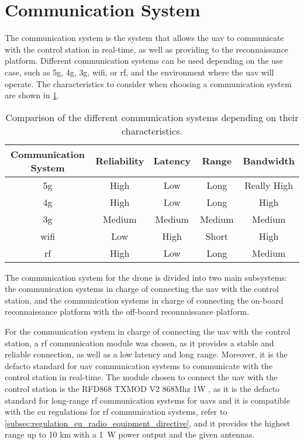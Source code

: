 \section{Communication System}\label{sec:design_communication_system}

The communication system is the system that allows the \gls{uav} to communicate with the control station in real-time, as well as providing to the reconnaissance platform. Different communication systems can be used depending on the use case, such as \gls{5g}, \gls{4g}, \gls{3g}, \gls{wifi}, or \gls{rf}, and the environment where the \gls{uav} will operate. The characteristics to consider when choosing a communication system are shown in \cref{tab:communication_system_characteristics}.

\begin{table}
  \begin{tabular}{ c c c c c }
    \toprule
    \textbf{Communication System} & \textbf{Reliability} & \textbf{Latency} & \textbf{Range} & \textbf{Bandwidth} \\
    \midrule
    \gls{5g} & High & Low & Long & Really High \\
    \gls{4g} & High & Low & Long & High \\
    \gls{3g} & Medium & Medium & Medium & Medium \\
    \gls{wifi} & Low & High & Short & High \\
    \gls{rf} & High & Low & Long & Medium \\
    \bottomrule
  \end{tabular}
  \caption{Comparison of the different communication systems depending on their characteristics.}\label{tab:communication_system_characteristics}
\end{table}

The communication system for the drone is divided into two main subsystems: the communication systems in charge of connecting the \gls{uav} with the control station, and the communication systems in charge of connecting the on-board reconnaissance platform with the off-board reconnaissance platform.

For the communication system in charge of connecting the \gls{uav} with the control station, a \gls{rf} communication module was chosen, as it provides a stable and reliable connection, as well as a low latency and long range. Moreover, it is the defacto standard for \gls{uav} communication systems to communicate with the control station in real-time. The module chosen to connect the \gls{uav} with the control station is the RFD868 TXMOD V2 868Mhz 1W \autocite{rcinnovationsComprarMdulos}, as it is the defacto standard for long-range \gls{rf} communication systems for \glspl{uav} and it is compatible with the \gls{eu} regulations for \gls{rf} communication systems, refer to \cref{subsec:regulation_eu_radio_equipment_directive}, and it provides the highest range up to 10 km with a \SI{1}{\watt} power output and the given antennas.


